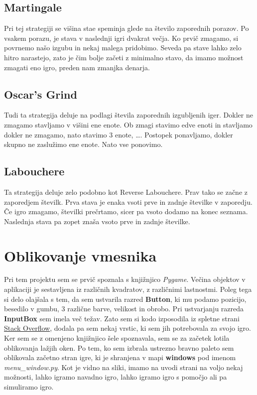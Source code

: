\documentclass[a4paper, 16pt]{article}
\begin{document}
\subsection{Martingale}
Pri tej strategiji se višina stae speminja glede na število zaporednih porazov. Po vsakem porazu, je stava v naslednji igri dvakrat večja. Ko prvič zmagamo, si povrnemo našo izgubu in nekaj malega pridobimo. Seveda pa stave lahko zelo hitro narastejo, zato je čim bolje začeti z minimalno stavo, da imamo možnost zmagati eno igro, preden nam zmanjka denarja.

\subsection{Oscar's Grind}
Tudi ta strategija deluje na podlagi števila zaporednih izgubljenih iger. Dokler ne zmagamo stavljamo v višini ene enote. Ob zmagi stavimo edve enoti in stavljamo dokler ne zmagamo, nato stavimo 3 enote, \dots. Postopek ponavljamo, dokler skupno ne zaslužimo ene enote. Nato vse ponovimo.

\subsection{Labouchere} 
Ta strategija deluje zelo podobno kot Reverse Labouchere. Prav tako se začne z zaporedjem številk. Prva stava je enaka vsoti prve in zadnje številke v zaporedju. Če igro zmagamo, številki prečrtamo, sicer pa vsoto dodamo na konec seznama. Naslednja stava pa zopet znaša vsoto prve in zadnje številke. 

 \section{Oblikovanje vmesnika}

Pri tem projektu sem se prvič spoznala s knjižnjico \textit{Pygame}. Večina objektov v aplikaciji je sestavljena iz različnih kvadratov, z različnimi lastnostmi. Poleg tega si delo olajšala s tem, da sem ustvarila razred \textbf{Button}, ki mu podamo pozicijo, besedilo v gumbu, 3 različne barve, velikost in obrobo. Pri ustvarjanju razreda \textbf{InputBox} sem imela več težav. Zato sem si kodo izposodila iz spletne strani \href{https://stackoverflow.com/questions/46390231/how-can-i-create-a-text-input-box-with-pygame}{Stack Overflow}, dodala pa sem nekaj vrstic, ki sem jih potrebovala za svojo igro.\\

Ker sem se z omenjeno knjižnjico šele spoznavala, sem se za začetek lotila oblikovanja lažjih oken. Po tem, ko sem izbrala ustrezno bravno paleto sem oblikovala začetno stran igre, ki je shranjena v mapi \textbf{windows} pod imenom \textit{menu\_window.py}. Kot je vidno na sliki, imamo na uvodi strani na voljo nekaj možnosti, lahko igramo navadno igro, lahko igramo igro s pomočjo ali pa simuliramo igro. 
\end{document}
